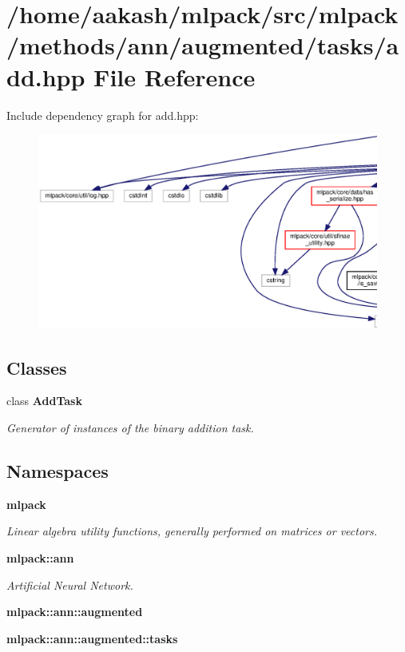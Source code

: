 \section{/home/aakash/mlpack/src/mlpack/methods/ann/augmented/tasks/add.hpp File Reference}
\label{augmented_2tasks_2add_8hpp}
Include dependency graph for add.\+hpp\+:
\nopagebreak
\begin{figure}[H]
\begin{center}
\leavevmode
\includegraphics[width=350pt]{augmented_2tasks_2add_8hpp__incl}
\end{center}
\end{figure}
\subsection*{Classes}
\begin{DoxyCompactItemize}
\item 
class \textbf{ Add\+Task}
\begin{DoxyCompactList}\small\item\em Generator of instances of the binary addition task. \end{DoxyCompactList}\end{DoxyCompactItemize}
\subsection*{Namespaces}
\begin{DoxyCompactItemize}
\item 
 \textbf{ mlpack}
\begin{DoxyCompactList}\small\item\em Linear algebra utility functions, generally performed on matrices or vectors. \end{DoxyCompactList}\item 
 \textbf{ mlpack\+::ann}
\begin{DoxyCompactList}\small\item\em Artificial Neural Network. \end{DoxyCompactList}\item 
 \textbf{ mlpack\+::ann\+::augmented}
\item 
 \textbf{ mlpack\+::ann\+::augmented\+::tasks}
\end{DoxyCompactItemize}


